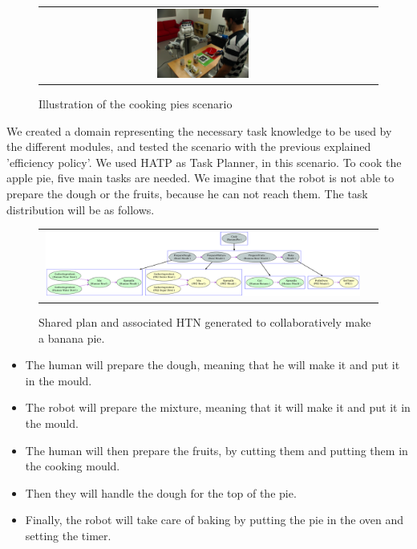 \begin{figure}[ht!]

 \centering
 \begin{tabular}{cc}
  \includegraphics[width=0.29\textwidth]{img/plan_management/scenario.JPG}
 \end{tabular}
   \vspace{-6pt}
 \caption{Illustration of the cooking pies scenario}
 \label{fig:plan_management-scenario}
 \end{figure}

We created a domain representing the necessary task knowledge to be used by the different modules, and tested the scenario with the previous explained 'efficiency policy'. We used HATP as Task Planner, in this  scenario.
To cook the apple pie, five main tasks are needed. We imagine that the robot is not able to prepare the dough or the fruits, because he can not reach them. The task distribution will be as follows.

\begin{figure}[ht!]
 \centering
 \begin{tabular}{cc}
  \includegraphics[width=0.99\textwidth]{img/plan_management/bananaPie.pdf}
 \end{tabular}
   \vspace{-8pt}
 \caption{Shared plan and associated HTN generated to collaboratively make a banana pie.}
 \label{fig:plan_management-bananaPlan}
   \vspace{-22pt}
 \end{figure}
 

\begin{itemize}
\item The human will prepare the dough, meaning that he will make it and put it in the mould.
\item The robot will prepare the mixture, meaning that it will make it and put it in the mould.
\item The human will then prepare the fruits, by cutting them and putting them in the cooking mould.
\item Then they will handle the dough for the top of the pie.
\item Finally, the robot will take care of baking by putting the pie in the oven and setting the timer.
\end{itemize} 

